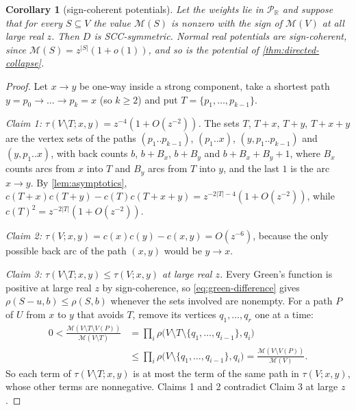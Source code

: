 \documentclass[11pt]{amsart}
\theoremstyle{plain}
\newtheorem{corollary}[theorem]{Corollary}
\theoremstyle{definition}
\theoremstyle{remark}
\numberwithin{equation}{section}
\newcommand{\RR}{\mathbb{R}}
\newcommand{\Puis}{\mathcal{P}_{\RR}}
\newcommand{\Mpot}{\mathcal{M}}           %
\begin{document}
\begin{corollary}[sign-coherent potentials]\label{cor:sign-coherent}
Let the weights lie in $\Puis$ and suppose that for every $S\subseteq V$ the value $\Mpot(S)$ is nonzero with the sign of $\Mpot(V)$ at all large real $z$. Then $D$ is SCC-symmetric. Normal real potentials are sign-coherent, since $\Mpot(S)=z^{|S|}(1+o(1))$, and so is the potential of \cref{thm:directed-collapse}.
\end{corollary}
\begin{proof}
Let $x\to y$ be one-way inside a strong component, take a shortest path $y=p_0\to\dots\to p_k=x$ (so $k\ge2$) and put $T=\{p_1,\dots,p_{k-1}\}$.

\emph{Claim 1: $\tau(V\setminus T;x,y)=z^{-4}(1+O(z^{-2}))$.} The sets $T$, $T+x$, $T+y$, $T+x+y$ are the vertex sets of the paths $(p_1..p_{k-1})$, $(p_1..x)$, $(y,p_1..p_{k-1})$ and $(y,p_1..x)$, with back counts $b$, $b+B_x$, $b+B_y$ and $b+B_x+B_y+1$, where $B_x$ counts arcs from $x$ into $T$ and $B_y$ arcs from $T$ into $y$, and the last $1$ is the arc $x\to y$. By \cref{lem:asymptotics}, $c(T{+}x)c(T{+}y)-c(T)c(T{+}x{+}y)=z^{-2|T|-4}(1+O(z^{-2}))$, while $c(T)^2=z^{-2|T|}(1+O(z^{-2}))$.

\emph{Claim 2: $\tau(V;x,y)=c(x)c(y)-c(x,y)=O(z^{-6})$}, because the only possible back arc of the path $(x,y)$ would be $y\to x$.

\emph{Claim 3: $\tau(V\setminus T;x,y)\le\tau(V;x,y)$ at large real $z$.} Every Green's function is positive at large real $z$ by sign-coherence, so \eqref{eq:green-difference} gives $\rho(S-u,b)\le\rho(S,b)$ whenever the sets involved are nonempty. For a path $P$ of $U$ from $x$ to $y$ that avoids $T$, remove its vertices $q_1,\dots,q_r$ one at a time:
\begin{align*}
0<\frac{\Mpot(V\setminus T\setminus V(P))}{\Mpot(V\setminus T)}&=\prod_i\rho\bigl(V\setminus T\setminus\{q_1,\dots,q_{i-1}\},q_i\bigr)\\
&\le\prod_i\rho\bigl(V\setminus\{q_1,\dots,q_{i-1}\},q_i\bigr)=\frac{\Mpot(V\setminus V(P))}{\Mpot(V)}.
\end{align*}
So each term of $\tau(V\setminus T;x,y)$ is at most the term of the same path in $\tau(V;x,y)$, whose other terms are nonnegative. Claims 1 and 2 contradict Claim 3 at large $z$.
\end{proof}
\end{document}
